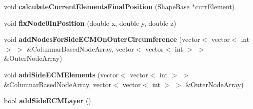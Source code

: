 \begin{DoxyCompactItemize}
\item 
\hypertarget{classSimulation_af6f6e9ee39d12e91957d934a2f1711f9}{}void {\bfseries calculate\+Current\+Elements\+Final\+Position} (\hyperlink{classShapeBase}{Shape\+Base} $\ast$curr\+Element)\label{classSimulation_af6f6e9ee39d12e91957d934a2f1711f9}

\item 
\hypertarget{classSimulation_a4897adef943963c8f79f45fcc52e409a}{}void {\bfseries fix\+Node0\+In\+Position} (double x, double y, double z)\label{classSimulation_a4897adef943963c8f79f45fcc52e409a}

\item 
\hypertarget{classSimulation_af9abdc7b290e97ec38a19a25d91ea86b}{}void {\bfseries add\+Nodes\+For\+Side\+E\+C\+M\+On\+Outer\+Circumference} (vector$<$ vector$<$ int $>$ $>$ \&Columnar\+Based\+Node\+Array, vector$<$ vector$<$ int $>$ $>$ \&Outer\+Node\+Array)\label{classSimulation_af9abdc7b290e97ec38a19a25d91ea86b}

\item 
\hypertarget{classSimulation_a0378bdf235e19187ba64fbab4941e1da}{}void {\bfseries add\+Side\+E\+C\+M\+Elements} (vector$<$ vector$<$ int $>$ $>$ \&Columnar\+Based\+Node\+Array, vector$<$ vector$<$ int $>$ $>$ \&Outer\+Node\+Array)\label{classSimulation_a0378bdf235e19187ba64fbab4941e1da}

\item 
\hypertarget{classSimulation_a10f3ae44a7b51d9cab524870235c1f3e}{}bool {\bfseries add\+Side\+E\+C\+M\+Layer} ()\label{classSimulation_a10f3ae44a7b51d9cab524870235c1f3e}

\end{DoxyCompactItemize}
